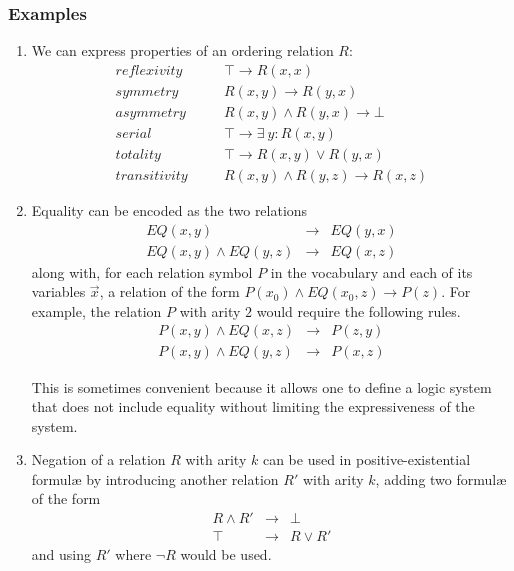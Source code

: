 		\subsubsection{Examples}
		\label{sec:technical_background.geometric_logic.examples}

			\begin{enumerate}
			\item
			We can express properties of an ordering relation $R$:
			\begin{eqnarray*}
			reflexivity   & \quad & \top \to R(x,x)                  \\
			symmetry      & \quad & R(x,y) \to R(y,x)                \\
			asymmetry     & \quad & R(x,y) \wedge R(y,x) \to \bot    \\
			serial        & \quad & \top \to \exists\ y : R(x,y)     \\
			totality      & \quad & \top \to R(x,y) \vee R(y,x)      \\
			transitivity  & \quad & R(x,y) \wedge R(y,z) \to R(x,z)
			\end{eqnarray*}

			\item \label{simulate_equality}
			Equality can be encoded as the two relations
				\begin{eqnarray*}
				EQ(x,y)                & \to & EQ(y,x)  \\
				EQ(x,y) \wedge EQ(y,z) & \to & EQ(x,z)
				\end{eqnarray*}
			along with, for each relation symbol $P$ in the vocabulary and each
			of its variables $\vec x$, a relation of the form $P(x_0) \wedge
			EQ(x_0,z) \to P(z)$. For example, the relation $P$ with arity $2$
			would require the following rules.
				\begin{eqnarray*}
				P(x,y) \wedge EQ(x,z) & \to & P(z,y)  \\
				P(x,y) \wedge EQ(y,z) & \to & P(x,z)
				\end{eqnarray*}

			This is sometimes convenient because it allows one to define a
			logic system that does not include equality without limiting
			the expressiveness of the system.

			\item
			Negation of a relation $R$ with arity $k$ can be used in
			positive-existential formul{\ae} by introducing another relation
			$R'$ with arity $k$, adding two formul{\ae} of the form
				\begin{eqnarray*}
				R \wedge R' & \to & \bot       \\
				\top        & \to & R \vee R'
				\end{eqnarray*}
			and using $R'$ where $\neg R$ would be used.


\end{enumerate}
